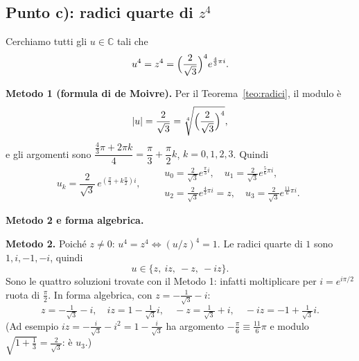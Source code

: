 \documentclass[11pt,a4paper]{article}
\newcommand{\CC}{\mathbb{C}}
\theoremstyle{plain}
\theoremstyle{definition}
\theoremstyle{remark}
\begin{document}
\subsection{Punto c): radici quarte di $z^4$}

Cerchiamo tutti gli $u\in\CC$ tali che
\[
  u^4=z^4=\Bigl(\frac2{\sqrt3}\Bigr)^4e^{\frac43\pi i}.
\]

\textbf{Metodo 1 (formula di de Moivre).} Per il Teorema~\ref{teo:radici}, il modulo è
\[
  |u|=\frac2{\sqrt3}=\sqrt[4]{\Bigl(\frac2{\sqrt3}\Bigr)^4},
\]
e gli argomenti sono $\dfrac{\frac43\pi+2\pi k}{4}=\dfrac\pi3+\dfrac{\pi}{2}k$, $k=0,1,2,3$. Quindi
\[
  u_k=\frac2{\sqrt3}\,e^{\left(\frac\pi3+k\frac\pi2\right)i},\qquad
  \begin{array}{l}
   u_0=\frac2{\sqrt3}e^{\frac\pi3 i},\quad u_1=\frac2{\sqrt3}e^{\frac56\pi i},\\[3pt]
   u_2=\frac2{\sqrt3}e^{\frac43\pi i}=z,\quad u_3=\frac2{\sqrt3}e^{\frac{11}6\pi i}.
  \end{array}
\]

\par\medskip
\noindent\textbf{Metodo 2 e forma algebrica.}\par

\textbf{Metodo 2.} Poiché $z\ne0$: $u^4=z^4\iff(u/z)^4=1$. Le radici quarte di $1$ sono $1,i,-1,-i$, quindi
\[
  u\in\{z,\ iz,\ -z,\ -iz\}.
\]
Sono le quattro soluzioni trovate con il Metodo 1: infatti moltiplicare per $i=e^{i\pi/2}$ ruota di $\frac\pi2$. In forma algebrica, con $z=-\frac1{\sqrt3}-i$:
\[
  z=-\tfrac1{\sqrt3}-i,\quad iz=1-\tfrac1{\sqrt3}i,\quad -z=\tfrac1{\sqrt3}+i,\quad -iz=-1+\tfrac1{\sqrt3}i .
\]
(Ad esempio $iz=-\frac i{\sqrt3}-i^2=1-\frac i{\sqrt3}$ ha argomento $-\frac\pi6\equiv\frac{11}6\pi$ e modulo $\sqrt{1+\frac13}=\frac2{\sqrt3}$: è $u_3$.)
\par\medskip
\end{document}
